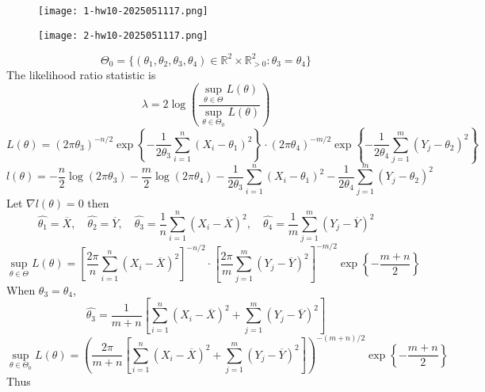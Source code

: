 \begin{exercise}
\begin{figure}[H]
\centering
\texttt{[image: 1-hw10-2025051117.png]}
\label{}
\end{figure}
\begin{figure}[H]
\centering
\texttt{[image: 2-hw10-2025051117.png]}
\label{}
\end{figure}
\end{exercise}
\[
\Theta_0=\{ (\theta_1,\theta_2,\theta_3,\theta_4)\in \mathbb{R}^2\times \mathbb{R}_{>0}^2:\theta_3=\theta_4 \}
\]
The likelihood ratio statistic is
\[
\lambda=2\log \left( \frac{\sup_{\theta\in\Theta}L(\theta)}{\sup_{\theta\in\Theta_0}L(\theta)} \right)
\]
\[
L(\theta)=(2\pi\theta_3)^{-n/2 }\exp \left\{  -\frac{1}{2\theta_3}\sum_{i=1}^{n} (X_i-\theta_1)^2  \right\}\cdot(2\pi\theta_4)^{-m/2 }\exp \left\{  -\frac{1}{2\theta_4}\sum_{j=1}^{m} (Y_j-\theta_2)^2  \right\}
\]
\[
l(\theta)=-\frac{n}{2}\log(2\pi\theta_3)-\frac{m}{2}\log(2\pi\theta_4)-\frac{1}{2\theta_3}\sum_{i=1}^{n} (X_i-\theta_1)^2-\frac{1}{2\theta_4}\sum_{j=1}^{m}(Y_j-\theta_2)^2 
\]
Let $\nabla l(\theta)=0$ then
\[
\widehat{\theta_1}=\overline{X},\quad \widehat{\theta_2}=\overline{Y},\quad \widehat{\theta_3}=\frac{1}{n}\sum_{i=1}^{n} (X_i-\overline{X})^2,\quad \widehat{\theta_4}=\frac{1}{m}\sum_{j=1}^{m} (Y_j-\overline{Y})^2
\]
\[
\sup_{\theta\in\Theta}L(\theta)=\left[ \frac{2\pi}{n}\sum_{i=1}^{n} (X_i-\overline{X})^2 \right]^{-n/2 }\cdot\left[ \frac{2\pi}{m}\sum_{j=1}^{m} (Y_j-\overline{Y})^2 \right]^{-m/2 }\exp \left\{  -\frac{m+n}{2}  \right\}
\]
When $\theta_3=\theta_4$,
\[
\widehat{\theta_3}=\frac{1}{m+n}\left[ \sum_{i=1}^{n} (X_i-\overline{X})^2+\sum_{j=1}^{m} (Y_j-\overline{Y})^2 \right]
\]
\[
\sup_{\theta\in\Theta_0}L(\theta)=\left( \frac{2\pi}{m+n}\left[ \sum_{i=1}^{n} (X_i-\overline{X})^2 +\sum_{j=1}^{m} (Y_j-\overline{Y})^2\right] \right)^{-(m+n)/2 }\exp \left\{  -\frac{m+n}{2}  \right\}
\]
Thus
